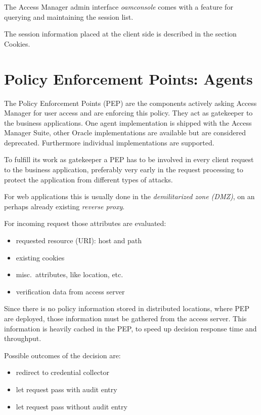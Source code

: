 The Access Manager admin interface \emph{oamconsole} comes with a
feature for querying and maintaining the session list.

The session information placed at the client side is described in the
section Cookies.


\section{Policy Enforcement Points: Agents}

The Policy Enforcement Points (PEP) are the components actively asking
Access Manager for user access and are enforcing this policy. They act
as gatekeeper to the business applications. One agent implementation is
shipped with the Access Manager Suite, other Oracle implementations are
available but are considered deprecated. Furthermore individual
implementations are supported.

To fulfill its work as gatekeeper a PEP has to be involved in every
client request to the business application, preferably very early in the
request processing to protect the application from different types of
attacks.

For web applications this is usually done in the \emph{demilitarized zone
(DMZ)}, on an perhaps already existing \emph{reverse proxy}.

For incoming request those attributes are evaluated:

\begin{itemize}
    \item requested resource (URI): host and path
    \item existing cookies
    \item misc.\ attributes, like location, etc.
    \item verification data from access server
\end{itemize}

Since there is no policy information stored in distributed locations,
where PEP are deployed, those information must be gathered from the
access server.  This information is heavily cached in the PEP, to speed
up decision response time and throughput.

Possible outcomes of the decision are:

\begin{itemize}
    \item redirect to credential collector
    \item let request pass with audit entry
    \item let request pass without audit entry
\end{itemize}


